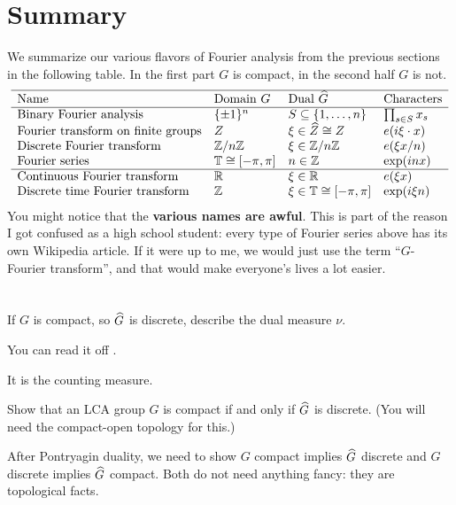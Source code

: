 \section{Summary}
We summarize our various flavors of Fourier analysis
from the previous sections in the following table.
In the first part $G$ is compact,
in the second half $G$ is not.
\[
	\begin{array}{llll}
		\hline
		\text{Name} & \text{Domain }G & \text{Dual }\widehat G
			& \text{Characters} \\ \hline
		\text{Binary Fourier analysis} & \{\pm1\}^n
			& S \subseteq \left\{ 1, \dots, n \right\}
			& \prod_{s \in S} x_s \\
		\text{Fourier transform on finite groups} & Z
			& \xi \in \widehat Z \cong Z & e( i \xi \cdot x) \\
		\text{Discrete Fourier transform} & \mathbb Z/n\mathbb Z & \xi \in \mathbb Z/n\mathbb Z
			& e(\xi x / n) \\
		\text{Fourier series} & \mathbb T \cong [-\pi, \pi]  & n \in \mathbb Z
			& \exp(inx) \\ \hline
		\text{Continuous Fourier transform} & \mathbb R & \xi \in \mathbb R
			& e(\xi x) \\
		\text{Discrete time Fourier transform} & \mathbb Z & \xi \in \mathbb T \cong [-\pi, \pi]
			& \exp(i \xi n) \\
	\end{array}
\]
You might notice that the \textbf{various names are awful}.
This is part of the reason I got confused as a high school student:
every type of Fourier series above has its own Wikipedia article.
If it were up to me, we would just use the term ``$G$-Fourier transform'',
and that would make everyone's lives a lot easier.



\section{\problemhead}
\begin{problem}
	If $G$ is compact, so $\widehat G$ is discrete,
	describe the dual measure $\nu$.
	\begin{hint}
		You can read it off .
	\end{hint}
	\begin{sol}
		It is the counting measure.
	\end{sol}
\end{problem}

\begin{problem}
	\label{prob:LCA_compact}
	Show that an LCA group $G$ is compact
	if and only if $\widehat G$ is discrete.
	(You will need the compact-open topology for this.)
	\begin{hint}
		After Pontryagin duality,
		we need to show $G$ compact implies $\widehat G$ discrete
		and $G$ discrete implies $\widehat G$ compact.
		Both do not need anything fancy:
		they are topological facts.
	\end{hint}
\end{problem}

